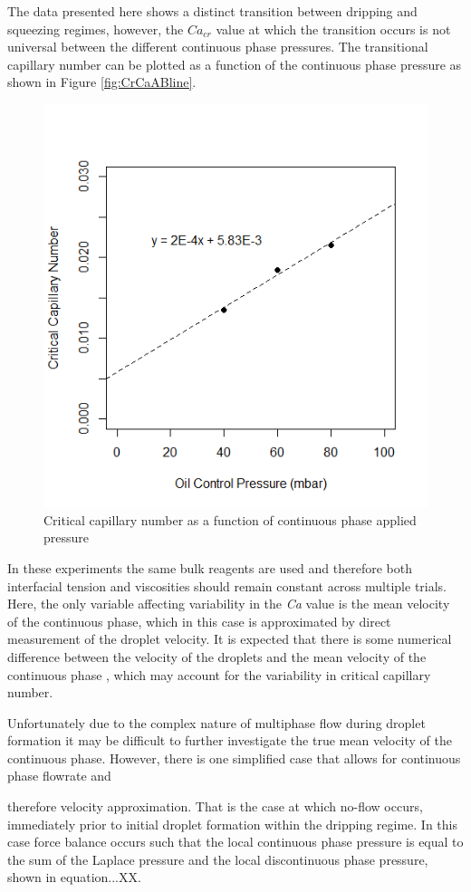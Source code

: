 The data presented here shows a distinct transition between dripping and squeezing regimes, however, the $Ca_{cr}$ value at which the transition occurs is not universal between the different continuous phase pressures. The transitional capillary number can be plotted as a function of the continuous phase pressure as shown in Figure \vref{fig:CrCaABline}.

\begin{figure}[H]
\centering 
\includegraphics[width=0.75\columnwidth]{CrCaABline.PNG} 
\caption[Critical capillary number as a function of continuous phase applied pressure]{Critical capillary number as a function of continuous phase applied pressure} 
\label{fig:CrCaABline} 
\end{figure}

In these experiments the same bulk reagents are used and therefore both interfacial tension and viscosities should remain constant across multiple trials. Here, the only variable affecting variability in the \emph{Ca} value is the mean velocity of the continuous phase, which in this case is approximated by direct measurement of the droplet velocity. It is expected that there is some numerical difference between the velocity of the droplets and the mean velocity of the continuous phase \cite{Ward2005}, which may account for the variability in critical capillary number.

Unfortunately due to the complex nature of multiphase flow during droplet formation it may be difficult to further investigate the true mean velocity of the continuous phase. However, there is one simplified case that allows for continuous phase flowrate and
\begin{center}

\end{center}
 therefore velocity approximation. That is the case at which no-flow occurs, immediately prior to initial droplet formation within the dripping regime. In this case force balance occurs such that the local continuous phase pressure is equal to the sum of the Laplace pressure and the local discontinuous phase pressure, shown in equation...XX.

